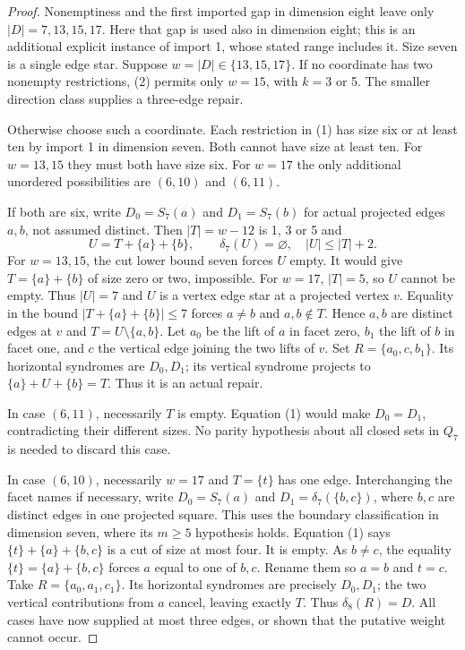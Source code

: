 \documentclass{article}
\begin{document}
\begin{proof}
Nonemptiness and the first imported gap in dimension eight leave only
$|D|=7,13,15,17$. Here that gap is used also in dimension eight; this is
an additional explicit instance of import 1, whose stated range includes it.
Size seven is a single edge star. Suppose $w=|D|\in\{13,15,17\}$.
If no coordinate has two nonempty restrictions, (2) permits only $w=15$,
with $k=3$ or 5. The smaller direction class supplies a three-edge repair.

Otherwise choose such a coordinate. Each restriction in (1) has size six
or at least ten by import 1 in dimension seven. Both cannot have size at
least ten. For $w=13,15$ they must both have size six. For $w=17$ the only
additional unordered possibilities are $(6,10)$ and $(6,11)$.

If both are six, write $D_0=S_7(a)$ and $D_1=S_7(b)$ for actual projected
edges $a,b$, not assumed distinct. Then $|T|=w-12$ is 1, 3 or 5 and
\[
 U=T+\{a\}+\{b\},\qquad \delta_7(U)=\varnothing,\quad |U|\le |T|+2.
\]
For $w=13,15$, the cut lower bound seven forces $U$ empty. It would give
$T=\{a\}+\{b\}$ of size zero or two, impossible.
For $w=17$, $|T|=5$, so $U$ cannot be empty. Thus $|U|=7$ and $U$ is a
vertex edge star at a projected vertex $v$. Equality in the bound
$|T+\{a\}+\{b\}|\le7$ forces $a\ne b$ and $a,b\notin T$.
Hence $a,b$ are distinct edges at $v$ and $T=U\setminus\{a,b\}$.
Let $a_0$ be the lift of $a$ in facet zero, $b_1$ the lift of $b$ in facet
one, and $c$ the vertical edge joining the two lifts of $v$. Set
$R=\{a_0,c,b_1\}$. Its horizontal syndromes are $D_0,D_1$; its vertical
syndrome projects to $\{a\}+U+\{b\}=T$. Thus it is an actual repair.

In case $(6,11)$, necessarily $T$ is empty. Equation (1) would make
$D_0=D_1$, contradicting their different sizes. No parity hypothesis
about all closed sets in $Q_7$ is needed to discard this case.

In case $(6,10)$, necessarily $w=17$ and $T=\{t\}$ has one edge.
Interchanging the facet names if necessary, write
$D_0=S_7(a)$ and $D_1=\delta_7(\{b,c\})$, where $b,c$ are distinct edges
in one projected square. This uses the boundary classification in dimension
seven, where its $m\ge5$ hypothesis holds. Equation (1) says
$\{t\}+\{a\}+\{b,c\}$ is a cut of size at most four. It is empty.
As $b\ne c$, the equality $\{t\}=\{a\}+\{b,c\}$ forces $a$ equal to
one of $b,c$. Rename them so $a=b$ and $t=c$.
Take $R=\{a_0,a_1,c_1\}$. Its horizontal syndromes are precisely $D_0,D_1$;
the two vertical contributions from $a$ cancel, leaving exactly $T$.
Thus $\delta_8(R)=D$. All cases have now supplied at most three edges,
or shown that the putative weight cannot occur.
\end{proof}
\end{document}
